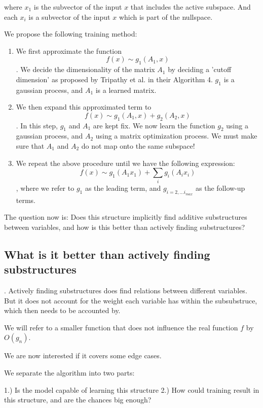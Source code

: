 where $x_1$ is the subvector of the input $x$ that includes the active subspace.
And each $x_i$ is a subvector of the input $x$ which is part of the nullspace.

We propose the following training method:

\begin{enumerate}
\item We first approximate the function 
$$ f(x) \sim g_1(A_1, x) $$.
We decide the dimensionality of the matrix $A_1$ by deciding a 'cutoff dimension' as proposed by Tripathy et al. in their Algorithm 4.
$g_1$ is a gaussian process, and $A_1$ is a learned matrix.

\item We then expand this approximated term to
$$ f(x) \sim g_1(A_1, x)  + g_2(A_2, x)$$.
In this step, $g_1$ and $A_1$ are kept fix.
We now learn the function $g_2$ using a gaussian process, and $A_2$ using a matrix optimization process.
We must make sure that $A_1$ and $A_2$ do not map onto the same subspace!

\item We repeat the above procedure until we have the following expression:
$$f(x) \sim g_1(A_1 x_1) + \sum_{i} g_i(A_i x_i)$$, where we refer to $g_1$ as the leading term, and $g_{i=2,...i_{max}}$ as the follow-up terms.

\end{enumerate}

The question now is: Does this structure implicitly find additive substructures between variables, and how is this better than actively finding substructures?

\subsection{What is it better than actively finding substructures}.
Actively finding substructures does find relations between different variables.
But it does not account for the weight each variable has within the subsubstruce, which then needs to be accounted by.

We will refer to a smaller function that does not influence the real function $f$ by $O(g_n)$.

We are now interested if it covers some edge cases.

We separate the algorithm into two parts:

1.) Is the model capable of learning this structure
2.) How could training result in this structure, and are the chances big enough?



